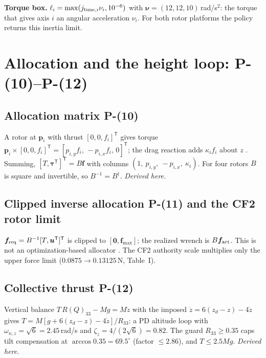 \documentclass[11pt]{article}
\newcommand{\srcroot}{../..}
\newcommand{\T}{^{\mathsf T}}
\newcommand{\Peq}[1]{P-(#1)}
\newcommand{\code}[1]{\path{#1}}
\theoremstyle{remark}
\newcommand{\listing}[4]{%
  \Needspace{8\baselineskip}%
  }
\begin{document}
\textbf{Torque box.} $\ell_i=\max(j_{{\rm tune},i}\nu_i,10^{-6})$ with $\bm\nu=(12,12,10)$\,rad/s$^2$: the torque that gives axis $i$
an angular acceleration $\nu_i$. For both rotor platforms the \code{model} policy returns this inertia limit.
\listing{src/gra_control/platforms/drone.py}{76}{98}{\code{torque_limits}}
\listing{experiments/final_robustness_gating_2026-09-20/run_final_robustness.py}{236}{254}{inertia, limits and the frozen $\rho=3$ baseline}

\section{Allocation and the height loop: \Peq{10}--\Peq{12}}
\subsection{Allocation matrix \Peq{10}}
A rotor at $\bm p_i$ with thrust $[0,0,f_i]\T$ gives torque $\bm p_i\times[0,0,f_i]\T=[p_{i,y}f_i,\,-p_{i,x}f_i,\,0]\T$; the drag
reaction adds $\kappa_if_i$ about $z$ \cite{garciacarrillo2013quad}. Summing, $[T,\bm\tau\T]\T=B\bm f$ with columns
$(1,\ p_{i,y},\ -p_{i,x},\ \kappa_i)$. For four rotors $B$ is square and invertible, so $B^{-1}=B^\dagger$.
\emph{Derived here.}
\listing{src/gra_control/platforms/drone.py}{67}{73}{$B$ from rotor-site positions and actuator gear; \code{np.linalg.inv(B)}}

\subsection{Clipped inverse allocation \Peq{11} and the CF2 rotor limit}
$\bm f_{\rm req}=B^{-1}[T,\bm u\T]\T$ is clipped to $[\bm0,\bm f_{\max}]$; the realized wrench is $B\bm f_{\rm act}$. This is not an
optimization-based allocator \cite{monteiro2016allocation}. The CF2 authority scale multiplies only the upper force limit
($0.0875\to0.13125$\,N, Table~I).
\listing{experiments/final_robustness_gating_2026-09-20/run_final_robustness.py}{280}{285}{\code{--actuator-scale} (1.5 for CF2, 1.0 for X2)}
\listing{experiments/final_robustness_gating_2026-09-20/run_final_robustness.py}{412}{422}{$\bm f_{\rm req}$, clip, rotor-saturation flag, realized wrench}

\subsection{Collective thrust \Peq{12}}
Vertical balance $T\,R(Q)_{33}-Mg=M\ddot z$ with the imposed $\ddot z=6(z_d-z)-4\dot z$ gives
$T=M[g+6(z_d-z)-4\dot z]/R_{33}$: a PD altitude loop with $\omega_{n,z}=\sqrt6=2.45$\,rad/s and $\zeta_z=4/(2\sqrt6)=0.82$.
The guard $R_{33}\ge0.35$ caps tilt compensation at $\arccos0.35=69.5^\circ$ (factor $\le2.86$), and $T\le2.5Mg$.
\emph{Derived here.}
\listing{experiments/final_robustness_gating_2026-09-20/run_final_robustness.py}{397}{410}{collective thrust}
\end{document}
